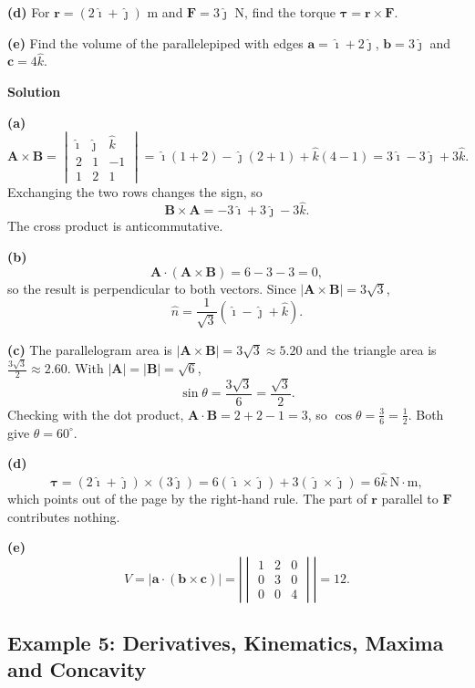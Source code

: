 \documentclass[12pt]{article}
\begin{document}
\textbf{(d)} For $\mathbf{r} = (2\hat{\imath}+\hat{\jmath})$ m and $\mathbf{F} = 3\hat{\jmath}$ N, find the torque $\boldsymbol{\tau} = \mathbf{r}\times\mathbf{F}$.

\textbf{(e)} Find the volume of the parallelepiped with edges $\mathbf{a} = \hat{\imath}+2\hat{\jmath}$, $\mathbf{b} = 3\hat{\jmath}$ and $\mathbf{c} = 4\hat{k}$.

\bigskip
\textbf{Solution}

\textbf{(a)}
\[
\mathbf{A}\times\mathbf{B}
= \begin{vmatrix}
\hat{\imath} & \hat{\jmath} & \hat{k}\\
2 & 1 & -1\\
1 & 2 & 1
\end{vmatrix}
= \hat{\imath}(1+2) - \hat{\jmath}(2+1) + \hat{k}(4-1)
= 3\hat{\imath}-3\hat{\jmath}+3\hat{k}.
\]
Exchanging the two rows changes the sign, so
\[
\mathbf{B}\times\mathbf{A} = -3\hat{\imath}+3\hat{\jmath}-3\hat{k}.
\]
The cross product is anticommutative.

\textbf{(b)}
\[
\mathbf{A}\cdot(\mathbf{A}\times\mathbf{B}) = 6-3-3 = 0,
\]
so the result is perpendicular to both vectors. Since $|\mathbf{A}\times\mathbf{B}| = 3\sqrt{3}$,
\[
\hat{n} = \frac{1}{\sqrt{3}}\left(\hat{\imath}-\hat{\jmath}+\hat{k}\right).
\]

\textbf{(c)} The parallelogram area is $|\mathbf{A}\times\mathbf{B}| = 3\sqrt{3} \approx 5.20$ and the triangle area is $\frac{3\sqrt{3}}{2}\approx 2.60$. With $|\mathbf{A}| = |\mathbf{B}| = \sqrt{6}$,
\[
\sin\theta = \frac{3\sqrt{3}}{6} = \frac{\sqrt{3}}{2}.
\]
Checking with the dot product, $\mathbf{A}\cdot\mathbf{B} = 2+2-1 = 3$, so $\cos\theta = \frac{3}{6} = \frac{1}{2}$. Both give $\theta = 60^\circ$.

\textbf{(d)}
\[
\boldsymbol{\tau} = (2\hat{\imath}+\hat{\jmath})\times(3\hat{\jmath})
= 6(\hat{\imath}\times\hat{\jmath}) + 3(\hat{\jmath}\times\hat{\jmath})
= 6\hat{k}\ \text{N}\cdot\text{m},
\]
which points out of the page by the right-hand rule. The part of $\mathbf{r}$ parallel to $\mathbf{F}$ contributes nothing.

\textbf{(e)}
\[
V = \left|\mathbf{a}\cdot(\mathbf{b}\times\mathbf{c})\right|
= \left|
\begin{vmatrix}
1 & 2 & 0\\
0 & 3 & 0\\
0 & 0 & 4
\end{vmatrix}
\right| = 12 .
\]


\subsection{Example 5: Derivatives, Kinematics, Maxima and Concavity}
\end{document}
